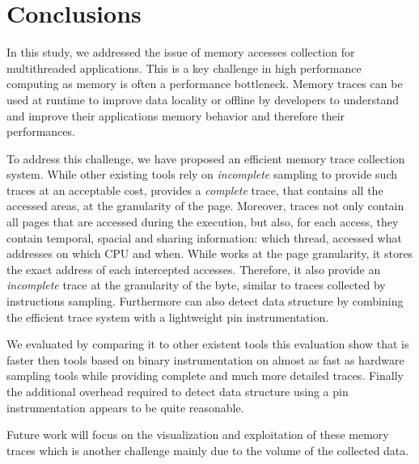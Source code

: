 \section{Conclusions}
\label{sec:cncl}

In this study, we addressed the issue of memory accesses collection for
multithreaded applications. This is a key challenge in high performance
computing as memory is often a performance
bottleneck. Memory traces can be used at runtime to improve data locality or
offline by developers to understand and improve their applications memory
behavior and therefore their performances.

To address this challenge, we have proposed \Moca an efficient memory trace
collection system. While other existing tools rely on \emph{incomplete} sampling to
provide such traces at an acceptable cost, \Moca provides a \emph{complete}
trace, that contains all the accessed areas, at the granularity of the page.
Moreover, \Moca traces not only
contain all pages that are accessed during the execution, but also, 
for each access, they contain temporal, spacial and sharing
information: which thread, accessed what addresses on which CPU and when.
While \Moca works at the page granularity, it stores the exact
address of each intercepted accesses. Therefore, it also provide an
\emph{incomplete} trace at the granularity of the byte, similar to
traces collected by instructions sampling. Furthermore \Moca can also detect
data structure by combining the efficient trace system with a lightweight pin
instrumentation.

We evaluated \Moca by comparing it to other existent tools this evaluation
show that \Moca is faster then tools based on binary instrumentation on
almost as fast as hardware sampling tools while providing complete and much
more detailed traces.
Finally the additional overhead required to detect data structure using a pin
instrumentation appears to be quite reasonable.

Future work will focus on the visualization and exploitation of these memory traces
which is another challenge mainly due to the volume of the collected data.
